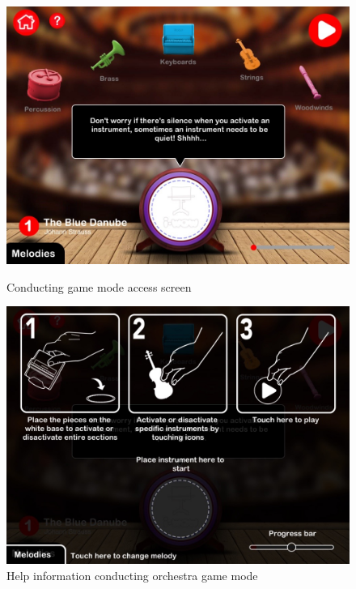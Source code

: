 \begin{figure}[ht!]
  \centering
  \includegraphics[width=350pt]{graphics/use-case/conducting_home_screen.jpg}
  \vspace{0.05cm}
  \caption{Conducting game mode access screen}
  \vspace{0.6cm}

  \includegraphics[width=350pt]{graphics/use-case/help_conducting_screen.jpg}
  \vspace{0.05cm}
  \caption{Help information conducting orchestra game mode}
\end{figure}


